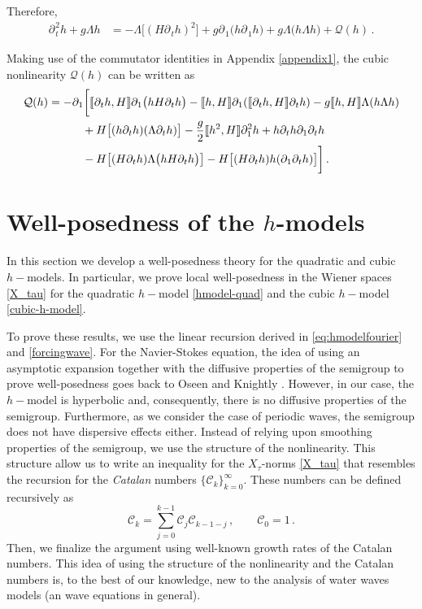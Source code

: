 \documentclass[11pt]{article}
\theoremstyle{plain}
\theoremstyle{definition}
\theoremstyle{definition}
\def\p{\text{\bf\emph{p}}}
\def\p{{\partial\hspace{1pt}}}
\def\comm#1#2{{\llbracket#1,#2\rrbracket}}
\begin{document}
Therefore,
\begin{align}
\p_{\!t}^2 h + g \Lambda h &= -\Lambda \big[(H\p_{\!t} h)^2\big] + g \p_{\!1} \big(h \p_{\!1} h \big) +g\Lambda \big(h \Lambda h \big)+ \mathcal{Q}(h)\,.
\label{cubic-h-model}
\end{align}

Making use of the commutator identities in Appendix \ref{appendix1}, the cubic nonlinearity $\mathcal{Q}(h)$ can be written as
\begin{align}
\mathcal{Q}(h) &= - \p_{\!1}\bigg{[} \comm{\p_{\!t} h}{H} \p_{\!1} \big(h H \p_{\!t} h \big)- \comm{h}{H} \p_{\!1} (\comm{\p_{\!t} h}{H} \p_{\!t} h)   - g \comm{h}{H} \Lambda (h \Lambda h) \nonumber\\
&\qquad\quad + H \big[(h \p_{\!t} h) (\Lambda \p_{\!t}h)\big] - \frac{g}{2}\comm{h^2}{H}\partial_1^2h+h \p_{\!t} h \partial_1 \p_{\!t} h  \nonumber\\
&\qquad\quad - H\big[(H \p_{\!t} h) \Lambda \big(h H \p_{\!t} h\big)\big] -H\big[(H \p_{\!t} h)  h (\p_{\!1}\p_{\!t} h)\big]\bigg{]}\,. \label{R(h)}
\end{align}


\section{Well-posedness of the $h$-models}\label{Catalansection}
In this section we develop a well-posedness theory for the quadratic and cubic $h-$models. In particular, we prove local well-posedness in the Wiener spaces \eqref{X_tau} for the quadratic $h-$model \eqref{hmodel-quad} and the cubic $h-$model \eqref{cubic-h-model}.

To prove these results, we use the linear recursion derived in \eqref{eq:hmodelfourier} and \eqref{forcingwave}. For the Navier-Stokes equation, the idea of using
 an asymptotic expansion together with the diffusive properties of the semigroup to prove well-posedness goes back to Oseen \cite{Os1912} and Knightly 
 \cite{Kn1966}. However, in our case, the $h-$model is hyperbolic and, consequently, there is no diffusive properties of the semigroup. Furthermore, as we 
 consider the case of periodic waves, the semigroup does not have dispersive effects either. Instead of relying upon smoothing properties of the semigroup, we use the structure of the nonlinearity. This structure allow us to write an inequality for the $X_{\tau}$-norms \eqref{X_tau} that resembles the recursion for the \emph{Catalan} numbers $\{\mathcal{C}_k\}_{k=0}^\infty$. These numbers can be defined recursively as
\begin{equation}\label{Catalan}
\mathcal{C}_k = \sum_{j=0}^{k-1} \mathcal{C}_j \mathcal{C}_{k-1-j}\,,\qquad \mathcal{C}_0 = 1\,.
\end{equation}
Then, we finalize the argument using well-known growth rates of the Catalan numbers. This idea of using the structure of the nonlinearity and the Catalan numbers is, to the best of our knowledge, new to the analysis of water waves models (an wave equations in general).
\end{document}
